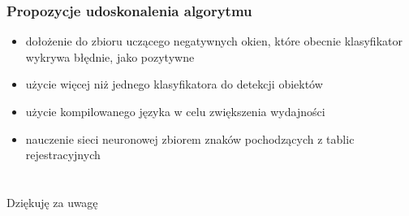 \documentclass{beamer}
\begin{document}
    \begin{frame}
        \frametitle{Propozycje udoskonalenia algorytmu}
        \begin{itemize}
            \item dołożenie do zbioru uczącego negatywnych okien, które obecnie klasyfikator wykrywa błędnie, jako pozytywne
            \item użycie więcej niż jednego klasyfikatora do detekcji obiektów
            \item użycie kompilowanego języka w celu zwiększenia wydajności
            \item nauczenie sieci neuronowej zbiorem znaków pochodzących z tablic rejestracyjnych
        \end{itemize}

%
    \end{frame}


    \section{}
    \begin{frame}
        \begin{center}
        {\Huge Dziękuję za uwagę}
        \end{center}
    \end{frame}
\end{document}
